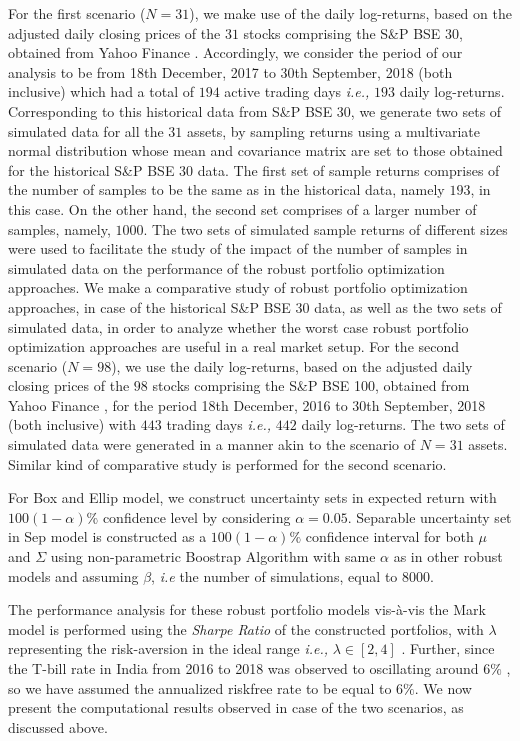 \documentclass[12pt]{article}
\numberwithin{equation}{section}
\begin{document}
For the first scenario ($N=31$), we make use of the daily log-returns, based on the adjusted daily closing prices of the $31$ stocks comprising the S\&P BSE 30, obtained from Yahoo Finance \cite{yf}. Accordingly, we consider the period of our analysis to be from 18th December, 2017 to 30th September, 2018 (both inclusive) which had a total of $194$ active trading days \textit{i.e.,} $193$ daily log-returns. Corresponding to this historical data from S\&P BSE 30, we generate two sets of simulated data for all the $31$ assets, by sampling returns using a multivariate normal distribution whose mean and covariance matrix are set to those obtained for the historical S\&P BSE 30 data. The first set of sample returns comprises of the number of samples to be the same as in the historical data, namely $193$, in this case. On the other hand, the second set comprises of a larger number of samples, namely, $1000$. The two sets of simulated sample returns of different sizes were used to facilitate the study of the impact of the number of samples in simulated data on the performance of the robust portfolio optimization approaches. We make a comparative study of robust portfolio optimization approaches, in case of the historical S\&P BSE 30 data, as well as the two sets of simulated data, in order to analyze whether the worst case robust portfolio optimization approaches are useful in a real market setup. For the second scenario ($N=98$), we use the daily log-returns, based on the adjusted daily closing prices of the $98$ stocks comprising the S\&P BSE 100, obtained from Yahoo Finance \cite{yf}, for the period 18th December, 2016 to 30th September, 2018 (both inclusive) with $443$ trading days \textit{i.e.,} $442$ daily log-returns. The two sets of simulated data were generated in a manner akin to the scenario of $N=31$ assets. Similar kind of comparative study is performed for the second scenario.

For Box and Ellip model, we construct uncertainty sets in expected return with $100(1-\alpha)\%$ confidence level by considering $\alpha=0.05$. Separable uncertainty set in Sep model is constructed as a $100(1-\alpha)\%$ confidence interval for both $\mu$ and $\Sigma$ using non-parametric Boostrap Algorithm with same $\alpha$ as in other robust models and assuming $\beta$, \textit{i.e} the number of simulations, equal to $8000$.

The performance analysis for these robust portfolio models vis-\`a-vis the Mark model is performed using the \textit{Sharpe Ratio} of the constructed portfolios, with $\lambda$ representing the risk-aversion in the ideal range \textit{i.e.,} $\lambda \in [2,4]$ \cite{Fabozzi07}. Further, since the T-bill rate in India from 2016 to 2018 was observed to oscillating around $6\%$ \cite{rbi}, so we have assumed the annualized riskfree rate to be equal to $6\%$. We now present the computational results observed in case of the two scenarios, as discussed above.
\end{document}
